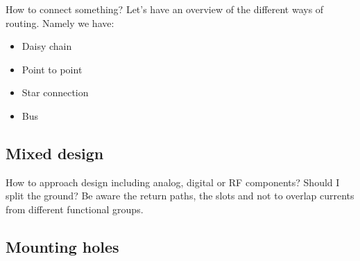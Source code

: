 \documentclass[final]{cubedoc}
\begin{document}
	How to connect something? Let's have an overview of the different ways of routing. %
	Namely we have:
	
	\begin{itemize}
		\item Daisy chain
		\item Point to point
		\item Star connection
		\item Bus
	\end{itemize}
	
	\subsection{Mixed design}
	
	
	How to approach design including analog, digital or RF components? Should I split the ground? Be aware the return paths, the slots and not to overlap currents from different functional groups.
	
	
	
	\subsection{Mounting holes}
	
	
	
\end{document}
